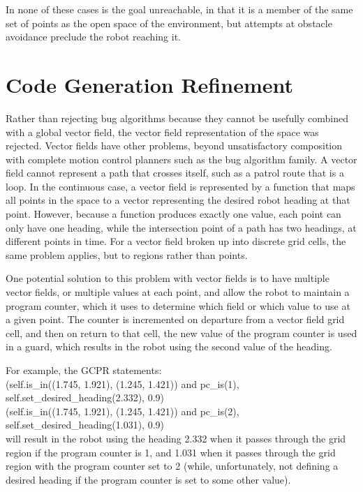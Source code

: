 In none of these cases is the goal unreachable, in that it is a member of the same set of points as the open space of the environment, but attempts at obstacle avoidance preclude the robot reaching it. 

\section{Code Generation Refinement}

Rather than rejecting bug algorithms because they cannot be usefully combined with a global vector field, the vector field representation of the space was rejected. 
Vector fields have other problems, beyond unsatisfactory composition with complete motion control planners such as the bug algorithm family. 
A vector field cannot represent a path that crosses itself, such as a patrol route that is a loop.
In the continuous case, a vector field is represented by a function that maps all points in the space to a vector representing the desired robot heading at that point. 
However, because a function produces exactly one value, each point can only have one heading, while the intersection point of a path has two headings, at different points in time. 
For a vector field broken up into discrete grid cells, the same problem applies, but to regions rather than points. 

One potential solution to this problem with vector fields is to have multiple vector fields, or multiple values at each point, and allow the robot to maintain a program counter, which it uses to determine which field or which value to use at a given point. 
The counter is incremented on departure from a vector field grid cell, and then on return to that cell, the new value of the program counter is used in a guard, which results in the robot using the second value of the heading. 

For example, the GCPR statements:\\
(self.is\_in((1.745, 1.921), (1.245, 1.421)) and pc\_is(1), self.set\_desired\_heading(2.332), 0.9)\\
(self.is\_in((1.745, 1.921), (1.245, 1.421)) and pc\_is(2), self.set\_desired\_heading(1.031), 0.9)\\
will result in the robot using the heading 2.332 when it passes through the grid region if the program counter is 1, and 1.031 when it passes through the grid region with the program counter set to 2 (while, unfortunately, not defining a desired heading if the program counter is set to some other value).

